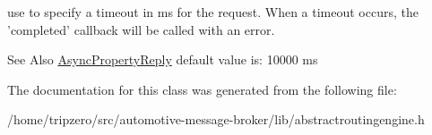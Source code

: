 use to specify a timeout in ms for the request. When a timeout occurs, the 'completed' callback will be called with an error. 

\begin{DoxySeeAlso}{See Also}
\hyperlink{classAsyncPropertyReply}{Async\-Property\-Reply} default value is\-: 10000 ms 
\end{DoxySeeAlso}


The documentation for this class was generated from the following file\-:\begin{DoxyCompactItemize}
\item 
/home/tripzero/src/automotive-\/message-\/broker/lib/abstractroutingengine.\-h\end{DoxyCompactItemize}
